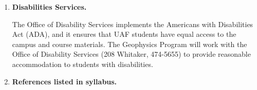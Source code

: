 \documentclass[10pt,titlepage,fleqn]{article}
\begin{document}
\begin{enumerate}
The instructor is available by appointment for additional assistance outside session hours. UAF has many student support programs, including the Math Hotline (1-866-UAF-MATH; 1-866-6284) and the Math and Stat Lab in Chapman building (see \verb+www.uaf.edu/dms/mathlab/+ for hours and details).

\item {\bf Disabilities Services.}

The Office of Disability Services implements the Americans with Disabilities Act (ADA), and it ensures that UAF students have equal access to the campus and course materials. The Geophysics Program will work with the Office of Disability Services (208 Whitaker, 474-5655) to provide reasonable accommodation to students with disabilities.


\pagebreak
\item {\bf References listed in syllabus.}

\renewcommand{\refname}{}

\vspace{-1.4cm}

\begin{spacing}{1.0}
%


\end{spacing}

\end{enumerate}

\end{document}

